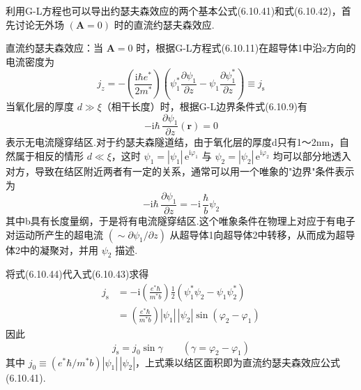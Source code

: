 利用G-L方程也可以导出约瑟夫森效应的两个基本公式(6.10.41)和式(6.10.42)，首先讨论无外场 $\left(\boldsymbol{A}=0\right)$ 时的直流约瑟夫森效应.

直流约瑟夫森效应：当 $\boldsymbol{A}=0$ 时，根据G-L方程式(6.10.11)在超导体1中沿z方向的电流密度为
\begin{equation}
  j_{z}=-\left(\frac{\mathrm{i}\hbar e^{*}}{2m^{*}}\right)
  \left(\psi^{*}_{1}\frac{\partial\psi_{1}}{\partial z}
  -\psi_{1}\frac{\partial\psi^{*}_{1}}{\partial z}\right)\equiv j_{\mathrm{s}}
\end{equation}
当氧化层的厚度 $d\gg\xi$（相干长度）时，根据G-L边界条件式(6.10.9)有
\begin{equation*}
  -\mathrm{i}\hbar\,\frac{\partial\psi_{1}}{\partial z}(\boldsymbol{r})=0
\end{equation*}
表示无电流隧穿结区.对于约瑟夫森隧道结，由于氧化层的厚度d只有1～2nm，自然属于相反的情形 $d\ll\xi$，这时
$\psi_{1}=|\psi_{1}|\,\mathrm{e}^{\mathrm{i}\varphi_{1}}$ 与
$\psi_{2}=|\psi_{2}|\,\mathrm{e}^{\mathrm{i}\varphi_{2}}$
均可以部分地透入对方，导致在结区附近两者有一定的关系，通常可以用一个唯象的"边界"条件表示为
\begin{equation}
  -\mathrm{i}\hbar\,\frac{\partial\psi_{1}}{\partial z}
  =-\mathrm{i}\,\frac{\hbar}{b}\psi_{2}
\end{equation}
其中b具有长度量纲，于是将有电流隧穿结区.这个唯象条件在物理上对应于有电子对运动所产生的超电流 $\left(\sim\partial\psi_{1}/\partial z\right)$ 从超导体1向超导体2中转移，从而成为超导体2中的凝聚对，并用 $\psi_{2}$ 描述.

将式(6.10.44)代入式(6.10.43)求得
\begin{equation*}
\begin{aligned}
  j_{\mathrm{s}}
  &=-\mathrm{i}\left(\frac{e^{*}\hbar}{m^{*}b}\right)\frac{1}{2}
  \left(\psi^{*}_{1}\psi_{2}-\psi_{1}\psi^{*}_{2}\right)\\
  &=\left(\frac{e^{*}\hbar}{m^{*}b}\right)
  |\psi_{1}|\,|\psi_{2}|\sin\left(\varphi_{2}-\varphi_{1}\right)
\end{aligned}
\end{equation*}
因此
\begin{equation}
  j_{\mathrm{s}}=j_{0}\sin\gamma
  \qquad\left(\gamma=\varphi_{2}-\varphi_{1}\right)
\end{equation}
其中 $j_{0}\equiv\left(e^{*}\hbar/m^{*}b\right)|\psi_{1}|\,|\psi_{2}|$，上式乘以结区面积即为直流约瑟夫森效应公式(6.10.41).

